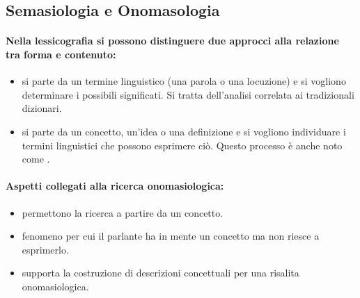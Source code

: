 



\subsection{Semasiologia e Onomasologia}

\paragraph{Nella lessicografia si possono distinguere due approcci alla relazione tra forma e contenuto:}

\begin{itemize}
  \item {} si parte da un termine linguistico (una parola o una locuzione) e si vogliono determinare i possibili significati. Si tratta dell'analisi correlata ai tradizionali dizionari.
  \item {} si parte da un concetto, un'idea o una definizione e si vogliono individuare i termini linguistici che possono esprimere ciò. Questo processo è anche noto come .
\end{itemize}

\paragraph{Aspetti collegati alla ricerca onomasiologica:}

\begin{itemize}
  \item {} permettono la ricerca a partire da un concetto. 
  \item {} fenomeno per cui il parlante ha in mente un concetto ma non riesce a esprimerlo. 
  \item {} supporta la costruzione di descrizioni concettuali per una risalita onomasiologica.
\end{itemize}

